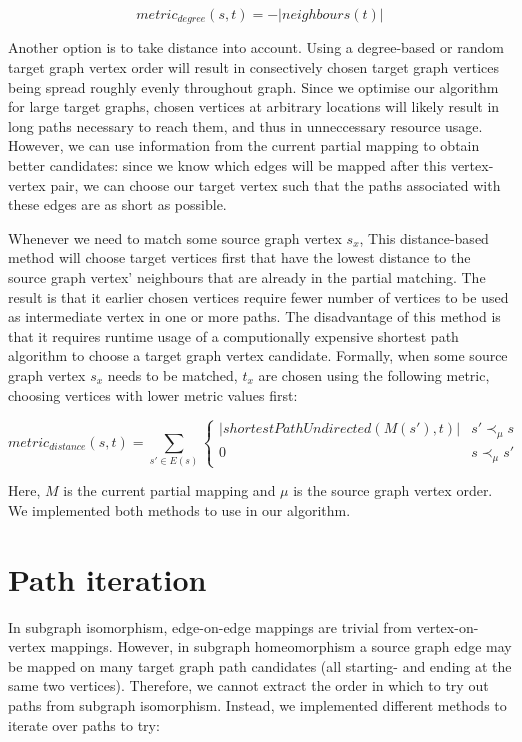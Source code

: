 $$\mathit{metric}_\mathit{degree}(s, t)=-|\mathit{neighbours}(t)|$$

Another option is to take distance into account. Using a degree-based or random target graph vertex order will result in consectively chosen target graph vertices being spread roughly evenly throughout graph. Since we optimise our algorithm for large target graphs, chosen vertices at arbitrary locations will likely result in long paths necessary to reach them, and thus in unneccessary resource usage. However, we can use information from the current partial mapping to obtain better candidates: since we know which edges will be mapped after this vertex-vertex pair, we can choose our target vertex such that the paths associated with these edges are as short as possible.

Whenever we need to match some source graph vertex $s_x$, This distance-based method will choose target vertices first that have the lowest distance to the source graph vertex' neighbours that are already in the partial matching. The result is that it earlier chosen vertices require fewer number of vertices to be used as intermediate vertex in one or more paths. The disadvantage of this method is that it requires runtime usage of a computionally expensive shortest path algorithm to choose a target graph vertex candidate. Formally, when some source graph vertex $s_x$ needs to be matched, $t_x$ are chosen using the following metric, choosing vertices with lower metric values first:


$$\mathit{metric}_\mathit{distance}(s, t)=\sum_{s' \in E(s)} \begin{cases}
|\mathit{shortestPathUndirected}(M(s'), t)| & s' \prec_\mu s\\
0 & s \prec_\mu s'
\end{cases}$$

Here, $M$ is the current partial mapping and $\mu$ is the source graph vertex order. We implemented both methods to use in our algorithm.

\section{Path iteration}
\label{sec:pathIteration}
In subgraph isomorphism, edge-on-edge mappings are trivial from vertex-on-vertex mappings. However, in subgraph homeomorphism a source graph edge may be mapped on many target graph path candidates (all starting- and ending at the same two vertices). Therefore, we cannot extract the order in which to try out paths from subgraph isomorphism. Instead, we implemented different methods to iterate over paths to try:


